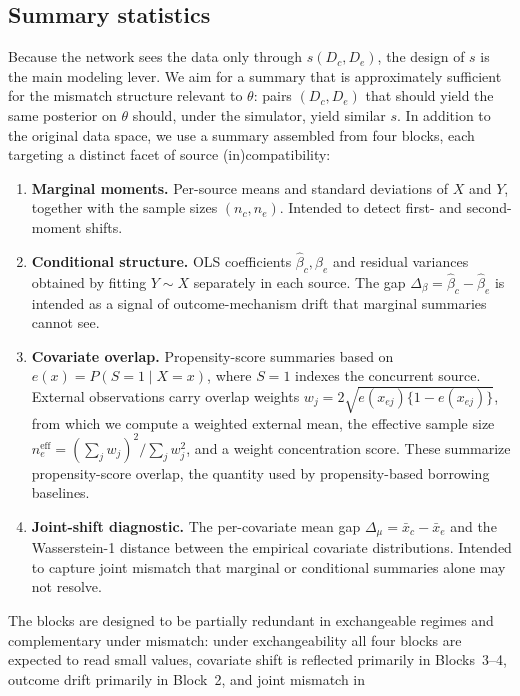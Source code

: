 \subsection{Summary statistics}
\label{sec:summary-stats}

Because the network sees the data only through $s(D_c, D_e)$, the design
of $s$ is the main modeling lever.
We aim for a summary that is approximately sufficient for the mismatch
structure relevant to $\theta$: pairs $(D_c, D_e)$ that should yield the
same posterior on $\theta$ should, under the simulator, yield similar $s$.
In addition to the original data space, we use a summary assembled from four blocks, each
targeting a distinct facet of source (in)compatibility:
\begin{enumerate}
  \item \textbf{Marginal moments.} Per-source means and standard
    deviations of $X$ and $Y$, together with the sample sizes
    $(n_c, n_e)$. Intended to detect first- and second-moment shifts.
  \item \textbf{Conditional structure.} OLS coefficients
    $\hat{\beta}_c, \hat{\beta}_e$ and residual variances obtained by
    fitting $Y \sim X$ separately in each source.
    The gap $\Delta_\beta = \hat\beta_c - \hat\beta_e$ is intended as a
    signal of outcome-mechanism drift that marginal summaries cannot see.
  \item \textbf{Covariate overlap.} Propensity-score summaries based on
    $e(x) = P(S{=}1 \mid X{=}x)$, where $S{=}1$ indexes the concurrent
    source. External observations carry overlap weights
    $w_j = 2\sqrt{e(x_{ej})\{1 - e(x_{ej})\}}$, from which we compute a
    weighted external mean, the effective sample size
    $n_e^{\mathrm{eff}} = (\sum_j w_j)^2 / \sum_j w_j^2$, and a weight
    concentration score. These summarize propensity-score overlap, the
    quantity used by propensity-based borrowing baselines.
  \item \textbf{Joint-shift diagnostic.} The per-covariate mean gap
    $\Delta_\mu = \bar{x}_c - \bar{x}_e$ and the Wasserstein-1 distance
    between the empirical covariate distributions. Intended to capture
    joint mismatch that marginal or conditional summaries alone may not
    resolve.
\end{enumerate}
The blocks are designed to be partially redundant in exchangeable regimes
and complementary under mismatch: under exchangeability all four blocks
are expected to read small values, covariate shift is reflected primarily
in Blocks~3--4, outcome drift primarily in Block~2, and joint mismatch in
